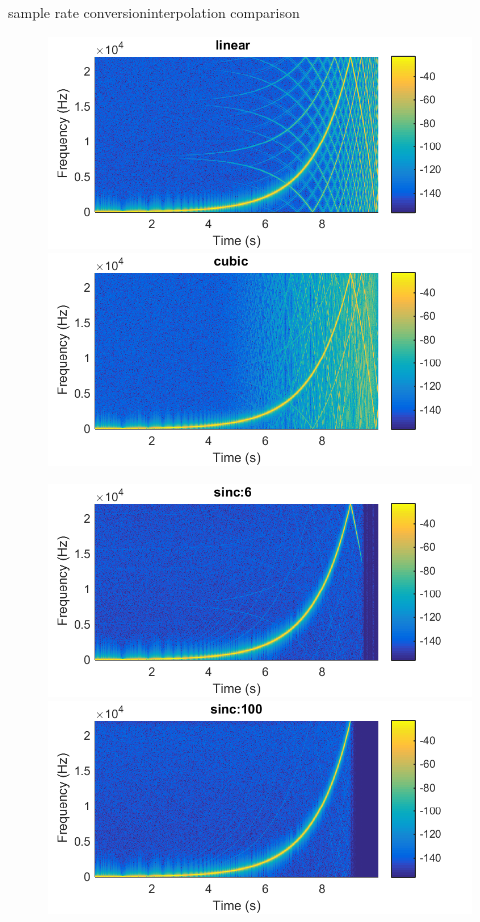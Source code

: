 	\begin{frame}{sample rate conversion}{interpolation comparison}
        \begin{figure}
            \hspace*{-5mm}
            \includegraphics[scale=.5]{graph/src_sine_1}
            \includegraphics[scale=.5]{graph/src_sine_2}

            \hspace*{-5mm}
            \includegraphics[scale=.5]{graph/src_sine_3}
            \includegraphics[scale=.5]{graph/src_sine_4}
        \end{figure}
	\end{frame}
